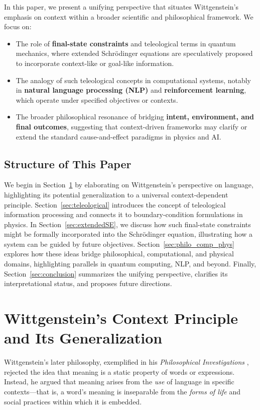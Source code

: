 \documentclass[11pt]{article}
\begin{document}
In this paper, we present a unifying perspective that situates Wittgenstein’s emphasis on context within a broader scientific and philosophical framework. We focus on:
\begin{itemize}
    \item The role of \textbf{final-state constraints} and teleological terms in quantum mechanics, where extended Schr\"odinger equations are speculatively proposed to incorporate context-like or goal-like information.
    \item The analogy of such teleological concepts in computational systems, notably in \textbf{natural language processing (NLP)} and \textbf{reinforcement learning}, which operate under specified objectives or contexts.
    \item The broader philosophical resonance of bridging \textbf{intent, environment, and final outcomes}, suggesting that context-driven frameworks may clarify or extend the standard cause-and-effect paradigms in physics and AI.
\end{itemize}

\subsection{Structure of This Paper}
We begin in Section~\ref{sec:wittgenstein} by elaborating on Wittgenstein's perspective on language, highlighting its potential generalization to a universal context-dependent principle. Section~\ref{sec:teleological} introduces the concept of teleological information processing and connects it to boundary-condition formulations in physics. In Section~\ref{sec:extendedSE}, we discuss how such final-state constraints might be formally incorporated into the Schr\"odinger equation, illustrating how a system can be guided by future objectives. Section~\ref{sec:philo_comp_phys} explores how these ideas bridge philosophical, computational, and physical domains, highlighting parallels in quantum computing, NLP, and beyond. Finally, Section~\ref{sec:conclusion} summarizes the unifying perspective, clarifies its interpretational status, and proposes future directions.

\section{Wittgenstein’s Context Principle and Its Generalization}
\label{sec:wittgenstein}
Wittgenstein’s later philosophy, exemplified in his \emph{Philosophical Investigations} \cite{Wittgenstein1953}, rejected the idea that meaning is a static property of words or expressions. Instead, he argued that meaning arises from the \emph{use} of language in specific contexts---that is, a word’s meaning is inseparable from the \emph{forms of life} and social practices within which it is embedded. 
\end{document}
